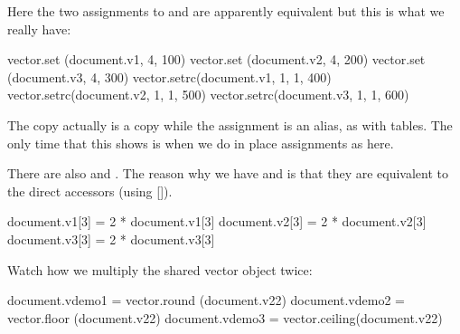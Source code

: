 \typebuffer[option=TEX] \getbuffer

Here the two assignments to  and  are apparently
equivalent but this is what we really have:

\startlines
{}
\stoplines

\startbuffer
\startluacode
vector.set  (document.v1, 4, 100)
vector.set  (document.v2, 4, 200)
vector.set  (document.v3, 4, 300)
vector.setrc(document.v1, 1, 1, 400)
vector.setrc(document.v2, 1, 1, 500)
vector.setrc(document.v3, 1, 1, 600)
\stopluacode
\stopbuffer

\typebuffer[option=TEX] \getbuffer

The copy actually is a copy while the assignment is an alias, as with tables. The
only time that this shows is when we do in place assignments as here.

\startlinecorrection
{} {} {\hbox{\tt {}}} {}
  {} {} {\hbox{\tt {}}} {}
  {} {} {\hbox{\tt {}}} {}
\stopcombination
\stoplinecorrection

There are also  and . The reason why we have 
and  is that they are equivalent to the direct accessors (using \type
{[]}).

\startbuffer
\startluacode
document.v1[3] = 2 * document.v1[3]
document.v2[3] = 2 * document.v2[3]
document.v3[3] = 2 * document.v3[3]
\stopluacode
\stopbuffer

\typebuffer[option=TEX] \getbuffer

Watch how we multiply the shared vector object twice:

\startlinecorrection %
 {} {\hbox{\tt {}}} {}
  {} {} {\hbox{\tt {}}} {}
  {} {} {\hbox{\tt {}}} {}
\stopcombination
\stoplinecorrection

\startbuffer
\startluacode
document.vdemo1 = vector.round  (document.v22)
document.vdemo2 = vector.floor  (document.v22)
document.vdemo3 = vector.ceiling(document.v22)
\stopluacode
\stopbuffer

